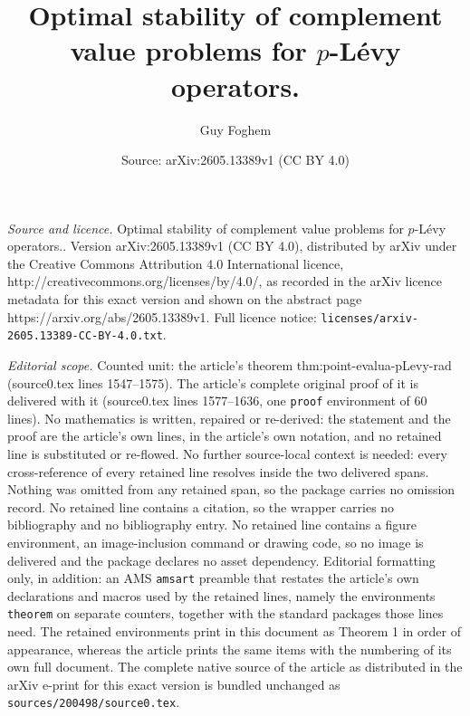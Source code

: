 \documentclass[10pt,a4paper]{amsart}
\title{Optimal stability of complement value problems for $p$-L{\'e}vy operators.}
\author{Guy Foghem}
\date{Source: arXiv:2605.13389v1 (CC BY 4.0)}
\begin{document}
\maketitle

\noindent\emph{Source and licence.} Optimal stability of complement value problems for $p$-L{\'e}vy operators.. Version arXiv:2605.13389v1 (CC BY 4.0), distributed by arXiv under the Creative Commons Attribution 4.0 International licence, http://creativecommons.org/licenses/by/4.0/, as recorded in the arXiv licence metadata for this exact version and shown on the abstract page https://arxiv.org/abs/2605.13389v1. Full licence notice: \texttt{licenses/arxiv-2605.13389-CC-BY-4.0.txt}.\par\smallskip

\noindent\textit{Editorial scope.} Counted unit: the article's theorem thm:point-evalua-pLevy-rad (source0.tex lines 1547--1575). The article's complete original proof of it is delivered with it (source0.tex lines 1577--1636, one \texttt{proof} environment of 60 lines). No mathematics is written, repaired or re-derived: the statement and the proof are the article's own lines, in the article's own notation, and no retained line is substituted or re-flowed.  No further source-local context is needed: every cross-reference of every retained line resolves inside the two delivered spans.  Nothing was omitted from any retained span, so the package carries no omission record.  No retained line contains a citation, so the wrapper carries no bibliography and no bibliography entry.  No retained line contains a figure environment, an image-inclusion command or drawing code, so no image is delivered and the package declares no asset dependency.  Editorial formatting only, in addition: an AMS \texttt{amsart} preamble that restates the article's own declarations and macros used by the retained lines, namely the environments \texttt{theorem} on separate counters, together with the standard packages those lines need.  The retained environments print in this document as Theorem 1 in order of appearance, whereas the article prints the same items with the numbering of its own full document.  The complete native source of the article as distributed in the arXiv e-print for this exact version is bundled unchanged as \texttt{sources/200498/source0.tex}.
\end{document}

